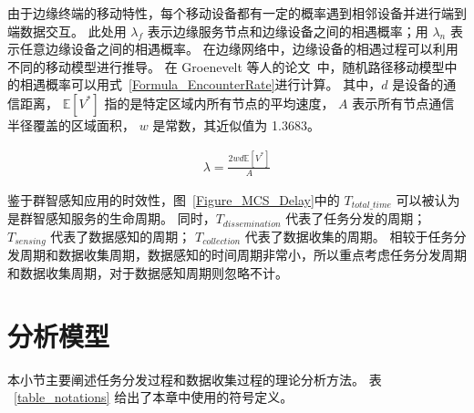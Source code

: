 
由于边缘终端的移动特性，每个移动设备都有一定的概率遇到相邻设备并进行端到端数据交互。
此处用 $\lambda_f$ 表示边缘服务节点和边缘设备之间的相遇概率；用 $\lambda_n$ 表示任意边缘设备之间的相遇概率。
在边缘网络中，边缘设备的相遇过程可以利用不同的移动模型进行推导。
在 Groenevelt 等人的论文~\cite{DBLP:journals/pe/GroeneveltNK05}中，随机路径移动模型中的相遇概率可以用式~\ref{Formula_EncounterRate}进行计算。
其中，$d$ 是设备的通信距离，
$\mathbb{E}[V^*]$ 指的是特定区域内所有节点的平均速度，
$A$ 表示所有节点通信半径覆盖的区域面积，
$w$ 是常数，其近似值为 1.3683。

\begin{equation}
  \label{Formula_EncounterRate}
  \begin{gathered}
  \lambda = \frac{2 w d \mathbb{E}[V^*]}{A}
  \end{gathered}
\end{equation}


鉴于群智感知应用的时效性，图~\ref{Figure_MCS_Delay}中的 $T_{total\_time}$ 可以被认为是群智感知服务的生命周期。
同时，$T_{dissemination}$ 代表了任务分发的周期；
$T_{sensing}$ 代表了数据感知的周期；
$T_{collection}$ 代表了数据收集的周期。
相较于任务分发周期和数据收集周期，数据感知的时间周期非常小，所以重点考虑任务分发周期和数据收集周期，对于数据感知周期则忽略不计。

\section{分析模型}
本小节主要阐述任务分发过程和数据收集过程的理论分析方法。
表 ~\ref{table_notations} 给出了本章中使用的符号定义。

